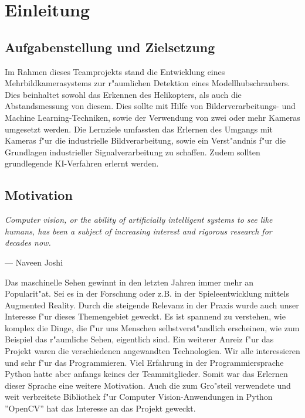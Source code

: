 \chapter{Einleitung}
\label{cha:einleitung}

\section{Aufgabenstellung und Zielsetzung}
\label {sec:aufgabenstellungzielsetzung}

Im Rahmen dieses Teamprojekts stand die Entwicklung eines Mehrbildkamerasystems zur r"aumlichen Detektion eines Modellhubschraubers. Dies beinhaltet sowohl das Erkennen des Helikopters, als auch die Abstandsmessung von diesem. Dies sollte mit Hilfe von Bilderverarbeitungs- und Machine Learning-Techniken, sowie der Verwendung von zwei oder mehr Kameras umgesetzt werden.\newline
Die Lernziele umfassten das Erlernen des Umgangs mit Kameras f"ur die industrielle Bildverarbeitung, sowie ein Verst"andnis f"ur die Grundlagen industrieller Signalverarbeitung zu schaffen. Zudem sollten grundlegende KI-Verfahren erlernt werden.

\section{Motivation}
\label {sec:motivation}

\setlength\epigraphwidth{15cm}
\setlength\epigraphrule{0pt}

\epigraph{\textit{\glqq Computer vision, or the ability of artificially intelligent systems to see like humans, has been a subject of increasing interest and rigorous research for decades now.\grqq{}}}{--- \textup{}Naveen Joshi\cite{NJ}\\}

\noindent Das maschinelle Sehen gewinnt in den letzten Jahren immer mehr an Popularit"at. Sei es in der Forschung oder z.B. in der Spieleentwicklung mittels Augmented Reality.\newline
Durch die steigende Relevanz in der Praxis wurde auch unser Interesse f"ur dieses Themengebiet geweckt. Es ist spannend zu verstehen, wie komplex die Dinge, die f"ur uns Menschen selbstverst"andlich erscheinen, wie zum Beispiel das r"aumliche Sehen, eigentlich sind.
Ein weiterer Anreiz f"ur das Projekt waren die verschiedenen angewandten Technologien. Wir alle interessieren und sehr f"ur das Programmieren. Viel Erfahrung in der Programmiersprache Python hatte aber anfangs keines der Teammitglieder. Somit war das Erlernen dieser Sprache eine weitere Motivation.\newline
Auch die zum Gro"steil verwendete und weit verbreitete Bibliothek f"ur Computer Vision-Anwendungen in Python ''OpenCV'' hat das Interesse an das Projekt geweckt.

